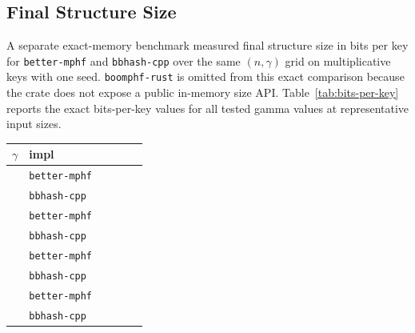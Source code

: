\documentclass[10pt]{article}
\begin{document}
\subsection{Final Structure Size}
A separate exact-memory benchmark measured final structure size in bits per key for \texttt{better-mphf} and \texttt{bbhash-cpp} over the same $(n,\gamma)$ grid on multiplicative keys with one seed. \texttt{boomphf-rust} is omitted from this exact comparison because the crate does not expose a public in-memory size API. Table~\ref{tab:bits-per-key} reports the exact bits-per-key values for all tested gamma values at representative input sizes.

\begin{table}[!htbp]
\centering
\scriptsize
\setlength{\tabcolsep}{4pt}
\begin{tabular}{r l c c c c}
\toprule
$\gamma$ & impl & \PaperBitsTableNOne{} & \PaperBitsTableNTwo{} & \PaperBitsTableNThree{} & \PaperBitsTableNFour{} \\
\midrule
\PaperBitsGammaOneLabel{} & \texttt{better-mphf} & \PaperBitsGammaOneBetterNOne{} & \PaperBitsGammaOneBetterNTwo{} & \PaperBitsGammaOneBetterNThree{} & \PaperBitsGammaOneBetterNFour{} \\
 & \texttt{bbhash-cpp} & \PaperBitsGammaOneCppNOne{} & \PaperBitsGammaOneCppNTwo{} & \PaperBitsGammaOneCppNThree{} & \PaperBitsGammaOneCppNFour{} \\
\PaperBitsGammaTwoLabel{} & \texttt{better-mphf} & \PaperBitsGammaTwoBetterNOne{} & \PaperBitsGammaTwoBetterNTwo{} & \PaperBitsGammaTwoBetterNThree{} & \PaperBitsGammaTwoBetterNFour{} \\
 & \texttt{bbhash-cpp} & \PaperBitsGammaTwoCppNOne{} & \PaperBitsGammaTwoCppNTwo{} & \PaperBitsGammaTwoCppNThree{} & \PaperBitsGammaTwoCppNFour{} \\
\PaperBitsGammaThreeLabel{} & \texttt{better-mphf} & \PaperBitsGammaThreeBetterNOne{} & \PaperBitsGammaThreeBetterNTwo{} & \PaperBitsGammaThreeBetterNThree{} & \PaperBitsGammaThreeBetterNFour{} \\
 & \texttt{bbhash-cpp} & \PaperBitsGammaThreeCppNOne{} & \PaperBitsGammaThreeCppNTwo{} & \PaperBitsGammaThreeCppNThree{} & \PaperBitsGammaThreeCppNFour{} \\
\PaperBitsGammaFourLabel{} & \texttt{better-mphf} & \PaperBitsGammaFourBetterNOne{} & \PaperBitsGammaFourBetterNTwo{} & \PaperBitsGammaFourBetterNThree{} & \PaperBitsGammaFourBetterNFour{} \\
 & \texttt{bbhash-cpp} & \PaperBitsGammaFourCppNOne{} & \PaperBitsGammaFourCppNTwo{} & \PaperBitsGammaFourCppNThree{} & \PaperBitsGammaFourCppNFour{} \\

\end{tabular}
\end{table}
\end{document}
